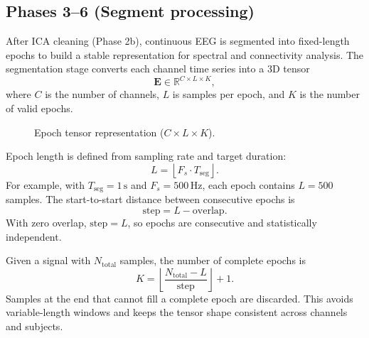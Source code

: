 \subsection{Phases 3--6 (Segment processing)}

After ICA cleaning (Phase 2b), continuous EEG is segmented into fixed-length epochs to build a stable representation for spectral and connectivity analysis. The segmentation stage converts each channel time series into a 3D tensor
\[
\mathbf{E}\in\mathbb{R}^{C\times L\times K},
\]
where $C$ is the number of channels, $L$ is samples per epoch, and $K$ is the number of valid epochs.
\begin{figure}[H]
\centering
{}
\caption{Epoch tensor representation ($C \times L \times K$).}
\end{figure}

Epoch length is defined from sampling rate and target duration:
\[
L=\left\lfloor F_s\cdot T_{\mathrm{seg}}\right\rfloor.
\]
For example, with $T_{\mathrm{seg}}=1\,\mathrm{s}$ and $F_s=500\,\mathrm{Hz}$, each epoch contains $L=500$ samples. The start-to-start distance between consecutive epochs is
\[
\mathrm{step}=L-\mathrm{overlap}.
\]
With zero overlap, $\mathrm{step}=L$, so epochs are consecutive and statistically independent.

Given a signal with $N_{\mathrm{total}}$ samples, the number of complete epochs is
\[
K=\left\lfloor\frac{N_{\mathrm{total}}-L}{\mathrm{step}}\right\rfloor+1.
\]
Samples at the end that cannot fill a complete epoch are discarded. This avoids variable-length windows and keeps the tensor shape consistent across channels and subjects.


